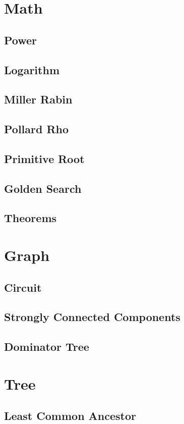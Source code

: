 \documentclass{article}
\begin{document}
\begin{multicols}{2}
    \section{Math}
    \subsection{Power}
    
    \subsection{Logarithm}
    
    \subsection{Miller Rabin}
    
    \subsection{Pollard Rho}
    
    \subsection{Primitive Root}
    
    \subsection{Golden Search}
    
    \subsection{Theorems}
    

    \section{Graph}
    \subsection{Circuit}
    
    \subsection{Strongly Connected Components}
    
    \subsection{Dominator Tree}
    

    \section{Tree}
    \subsection{Least Common Ancestor}
    
\end{multicols}
\end{document}
